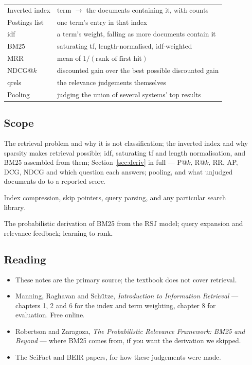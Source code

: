 \documentclass[11pt,a4paper]{article}
\begin{document}
\begin{center}
\small
\begin{tabular}{ll}
\toprule
Inverted index  & term $\rightarrow$ the documents containing it, with counts \\
Postings list   & one term's entry in that index \\
idf             & a term's weight, falling as more documents contain it \\
BM25            & saturating tf, length-normalised, idf-weighted \\
MRR             & mean of $1/(\text{rank of first hit})$ \\
NDCG@$k$        & discounted gain over the best possible discounted gain \\
qrels           & the relevance judgements themselves \\
Pooling         & judging the union of several systems' top results \\
\bottomrule
\end{tabular}
\end{center}

\subsection{Scope}

 The retrieval problem and why it is not classification; the
inverted index and why sparsity makes retrieval possible; idf, saturating tf
and length normalisation, and BM25 assembled from them; Section~\ref{sec:deriv}
in full --- P@$k$, R@$k$, RR, AP, DCG, NDCG and which question each answers;
pooling, and what unjudged documents do to a reported score.

 Index compression, skip pointers, query
parsing, and any particular search library.

 The probabilistic derivation of BM25 from the RSJ
model; query expansion and relevance feedback; learning to rank.

\subsection{Reading}

\begin{itemize}[leftmargin=*,nosep]
  \item These notes are the primary source; the textbook does not cover
        retrieval.
  \item Manning, Raghavan and Sch\"utze, \emph{Introduction to Information
        Retrieval} --- chapters 1, 2 and 6 for the index and term weighting,
        chapter 8 for evaluation. Free online.
  \item Robertson and Zaragoza, \emph{The Probabilistic Relevance Framework:
        BM25 and Beyond} --- where BM25 comes from, if you want the derivation
        we skipped.
  \item The SciFact and BEIR papers, for how these judgements were made.
\end{itemize}
\end{document}
